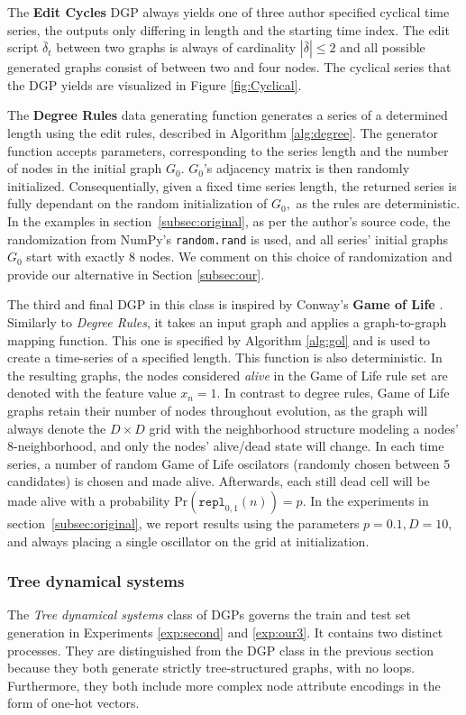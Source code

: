The \textbf{Edit Cycles} DGP always yields one of three author specified cyclical time series, the outputs only differing in length and the starting time index. The edit script $\bar{\delta}_{t}$ between two graphs is always of cardinality $|\bar{\delta}| \leq 2$ and all possible generated graphs consist of between two and four nodes. The cyclical series that the DGP yields are visualized in Figure \ref{fig:Cyclical}.

The \textbf{Degree Rules} data generating function generates a series of a determined length using the edit rules, described in Algorithm \ref{alg:degree}. The generator function accepts parameters, corresponding to the series length and the number of nodes in the initial graph $G_{0}.$ $G_{0}$'s adjacency matrix is then randomly initialized. Consequentially, given a fixed time series length, the returned series is fully dependant on the random initialization of $G_{0},$ as the rules are deterministic. In the examples in section~\ref{subsec:original}, as per the author's source code, the randomization from NumPy's \texttt{random.rand} is used, and all series' initial graphs $G_{0}$ start with exactly 8 nodes. We comment on this choice of randomization and provide our alternative in Section \ref{subsec:our}.

The third and final DGP in this class is inspired by Conway's \textbf{Game of Life} \cite{GoL}. Similarly to \textit{Degree Rules}, it takes an input graph and applies a graph-to-graph mapping function. This one is specified by Algorithm \ref{alg:gol} and is used to create a time-series of a specified length. This function is also deterministic.
In the resulting graphs, the nodes considered \textit{alive} in the Game of Life rule set are denoted with the feature value $x_{n}=1.$ In contrast to degree rules, Game of Life graphs retain their number of nodes throughout evolution, as the graph will always denote the $D \times D$ grid with the neighborhood structure modeling a nodes' 8-neighborhood, and only the nodes' alive/dead state will change. In each time series, a number of random Game of Life oscilators (randomly chosen between 5 candidates) is chosen and made alive. Afterwards, each still dead cell will be made alive with a probability $\text{Pr}(\texttt{repl}_{0,1}(n)) = p$. In the experiments in section~\ref{subsec:original}, we report results using the parameters $p = 0.1, D=10,$ and always placing a single oscillator on the grid at initialization.

\subsubsection{Tree dynamical systems}
\label{subsec:trees}
The \textit{Tree dynamical systems} class of DGPs governs the train and test set generation in Experiments \ref{exp:second} and \ref{exp:our3}. It contains two distinct processes. They are distinguished from the DGP class in the previous section because they both generate strictly tree-structured graphs, with no loops. Furthermore, they both include more complex node attribute encodings in the form of one-hot vectors.

